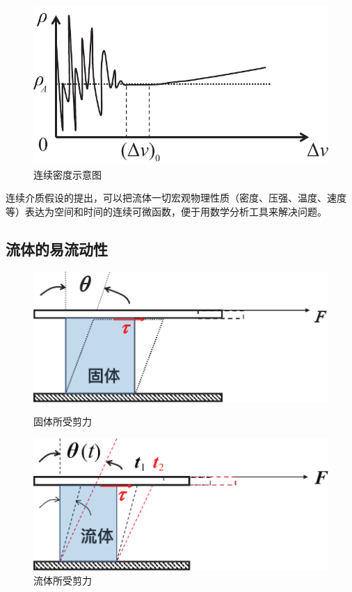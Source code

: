 

\begin{figure}[!htb]
	\centering
	\includegraphics[width=0.4\linewidth]{pic/连续密度.pdf}
	\vspace*{-0.5em}
	\caption{连续密度示意图}
	\label{连续密度}
\end{figure}

连续介质假设的提出，可以把流体一切宏观物理性质（密度、压强、温度、速度等）表达为空间和时间的连续可微函数，便于用数学分析工具来解决问题。

\subsection{流体的易流动性}
\vspace*{-1em}

\begin{figure}[!htb]
	\begin{minipage}{0.5 \linewidth}
		\centering
		\includegraphics[width=0.8\linewidth]{pic/固体流动.pdf}
		\caption{固体所受剪力}
		\label{固体流动}
	\end{minipage}
	\begin{minipage}{0.5 \linewidth}
		\centering
		\includegraphics[width=0.8\linewidth]{pic/流体流动.pdf}
		\caption{流体所受剪力}
		\label{流体流动}
	\end{minipage}
\end{figure}
\vspace*{-1em}

